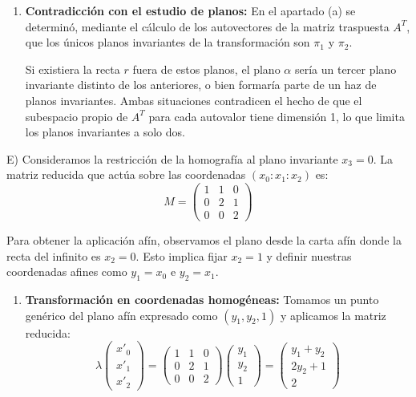 {\begin{enumerate}
    \item \textbf{Contradicción con el estudio de planos:}
    En el apartado (a) se determinó, mediante el cálculo de los autovectores de la matriz traspuesta $A^T$, que los únicos planos invariantes de la transformación son $\pi_1$ y $\pi_2$. 
    
    Si existiera la recta $r$ fuera de estos planos, el plano $\alpha$ sería un tercer plano invariante distinto de los anteriores, o bien formaría parte de un haz de planos invariantes. Ambas situaciones contradicen el hecho de que el subespacio propio de $A^T$ para cada autovalor tiene dimensión 1, lo que limita los planos invariantes a solo dos.
\end{enumerate}
E)
Consideramos la restricción de la homografía al plano invariante $x_3 = 0$. La matriz reducida que actúa sobre las coordenadas $(x_0 : x_1 : x_2)$ es:
\[
M = \begin{pmatrix} 1 & 1 & 0 \\ 0 & 2 & 1 \\ 0 & 0 & 2 \end{pmatrix}
\]

Para obtener la aplicación afín, observamos el plano desde la carta afín donde la recta del infinito es $x_2 = 0$. Esto implica fijar $x_2 = 1$ y definir nuestras coordenadas afines como $y_1 = x_0$ e $y_2 = x_1$.

\begin{enumerate}
    \item \textbf{Transformación en coordenadas homogéneas:}
    Tomamos un punto genérico del plano afín expresado como $(y_1, y_2, 1)$ y aplicamos la matriz reducida:
    \[
    \lambda \begin{pmatrix} x'_0 \\ x'_1 \\ x'_2 \end{pmatrix} = 
    \begin{pmatrix} 1 & 1 & 0 \\ 0 & 2 & 1 \\ 0 & 0 & 2 \end{pmatrix}
    \begin{pmatrix} y_1 \\ y_2 \\ 1 \end{pmatrix} = 
    \begin{pmatrix} y_1 + y_2 \\ 2y_2 + 1 \\ 2 \end{pmatrix}
    \]


\end{enumerate}}
